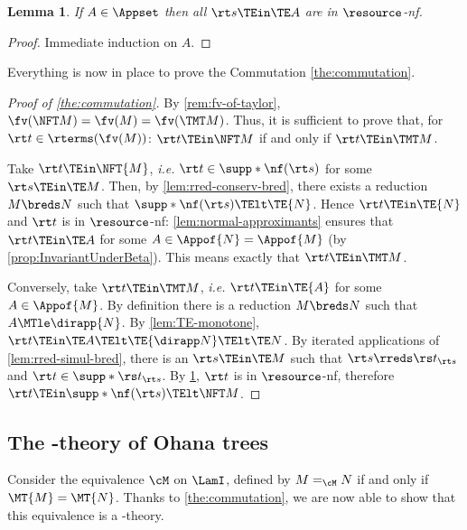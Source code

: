 \documentclass[10pt,a4paper]{amsart}
\newtheorem{lemma}[theorem]{Lemma}
\theoremstyle{definition}
\begin{document}
\setcounter{lem:TE-of-A-is-normal}{\thetheorem}
\begin{lemma}
\label{lem:TE-of-A-is-normal}
	If $A \in \Appset$ then all $\rt s \TEin \TE A$
	are in $\resource$-nf.
\end{lemma}

	\begin{proof}
	Immediate induction on $A$.
	\end{proof}

Everything is now in place to prove the Commutation \cref{the:commutation}.

\begin{proof}[Proof of \cref{the:commutation}]
	By \cref{rem:fv-of-taylor}, $\fv(\NFT M) = \fv(M) = \fv(\TMT M)$.
	Thus, it is sufficient to prove that, 
	for $\rt t \in \rterms(\fv(M))$:
	$\rt t \TEin \NFT M$ if and only if $\rt t \TEin \TMT M$.
	
	Take $\rt t \TEin \NFT{M}$, \emph{i.e.} $\rt t \in \supp*{\nf(\rt s)}$
	for some $\rt s \TEin \TE M$.
	Then, by \cref{lem:rred-conserv-bred}, there exists
	a reduction $M \breds N$
	such that $\supp*{\nf(\rt s)} \TElt \TE{N}$.
	Hence $\rt t \TEin \TE{N}$ and $\rt t$ is in $\resource$-nf: 
	\cref{lem:normal-approximants} ensures that $\rt t \TEin \TE A$ 
	for some $A\in \Appof{N}=\Appof{M}$ (by \cref{prop:InvariantUnderBeta}).
	This means exactly that $\rt t \TEin \TMT M$.
	
	Conversely, take $\rt t \TEin \TMT M$, \emph{i.e.}
	$\rt t \TEin \TE{A}$ for some $A \in \Appof{M}$.
	By definition there is a reduction $M \breds N$
	such that $A \MTle \dirapp{N}$.
	By \cref{lem:TE-monotone},
	$\rt t \TEin \TE A \TElt \TE{\dirapp N} \TElt \TE N$.
	By iterated applications of \cref{lem:rred-simul-bred}, 
	there is an $\rt s \TEin \TE M$ such that
	$\rt s \rreds \rs t_{\rt s}$ and $\rt t \in \supp*{\rs t_{\rt s}}$.
	By \cref{lem:TE-of-A-is-normal}, $\rt t$ is in $\resource$-nf,
	therefore $\rt t \TEin \supp*{\nf(\rt s)} \TElt \NFT M$.
\end{proof}


\subsection{The \lamI-theory of Ohana trees}

Consider the equivalence $\cM$ on $\LamI$, 
defined by $M =_{\cM} N$ if and only if $\MT{M} = \MT{N}$.
Thanks to \cref{the:commutation},
we are now able to show that this equivalence is a \lamI-theory.
\end{document}
